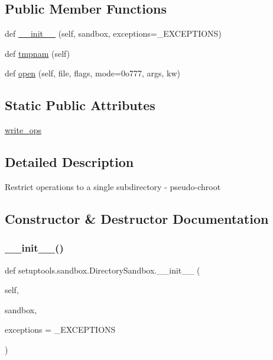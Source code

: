 \subsection*{Public Member Functions}
\begin{DoxyCompactItemize}
\item 
def \hyperlink{classsetuptools_1_1sandbox_1_1DirectorySandbox_a64ffc139aee0544ed4eea933a195b894}{\+\_\+\+\_\+init\+\_\+\+\_\+} (self, sandbox, exceptions=\+\_\+\+E\+X\+C\+E\+P\+T\+I\+O\+NS)
\item 
def \hyperlink{classsetuptools_1_1sandbox_1_1DirectorySandbox_a18c44e615e844e4b235eb65cdbc0faea}{tmpnam} (self)
\item 
def \hyperlink{classsetuptools_1_1sandbox_1_1DirectorySandbox_aea079a4915b61a59a9e5fbf5b12053f2}{open} (self, file, flags, mode=0o777, args, kw)
\end{DoxyCompactItemize}
\subsection*{Static Public Attributes}
\begin{DoxyCompactItemize}
\item 
\hyperlink{classsetuptools_1_1sandbox_1_1DirectorySandbox_aff584c6cf57155616b5e0c03db1dd317}{write\+\_\+ops}
\end{DoxyCompactItemize}


\subsection{Detailed Description}
\begin{DoxyVerb}Restrict operations to a single subdirectory - pseudo-chroot\end{DoxyVerb}
 

\subsection{Constructor \& Destructor Documentation}
\mbox{\label{classsetuptools_1_1sandbox_1_1DirectorySandbox_a64ffc139aee0544ed4eea933a195b894}} 
\subsubsection{\texorpdfstring{\+\_\+\+\_\+init\+\_\+\+\_\+()}{\_\_init\_\_()}}
{\footnotesize\ttfamily def setuptools.\+sandbox.\+Directory\+Sandbox.\+\_\+\+\_\+init\+\_\+\+\_\+ (\begin{DoxyParamCaption}\item[{}]{self,  }\item[{}]{sandbox,  }\item[{}]{exceptions = {\ttfamily \+\_\+EXCEPTIONS} }\end{DoxyParamCaption})}



